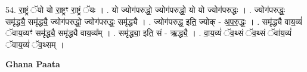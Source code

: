 \documentclass[17pt]{extarticle}
\begin{document}
54. रा॒ष्ट्रं ॅयो यो रा॒ष्ट्रꣳ रा॒ष्ट्रं ॅयः । . यो ज्योग॑परुद्धो॒ ज्योग॑परुद्धो॒ यो यो ज्योग॑परुद्धः । . ज्योग॑परुद्धः॒ समृ॑द्ध्यै॒ समृ॑द्ध्यै॒ ज्योग॑परुद्धो॒ ज्योग॑परुद्धः॒ समृ॑द्ध्यै । . ज्योग॑परुद्ध॒ इति॒ ज्योक् - अ॒प॒रु॒द्धः॒ । . समृ॑द्ध्यै वाय॒व्यं॑ ॅवाय॒व्यꣳ॑ समृ॑द्ध्यै॒ समृ॑द्ध्यै वाय॒व्य᳚म् । . समृ॑द्ध्या॒ इति॒ सं - ऋ॒द्ध्यै॒ । . वा॒य॒व्यं॑ ॅव॒थ्सं ॅव॒थ्सं ॅवा॑य॒व्यं॑ ॅवाय॒व्यं॑ ॅव॒थ्सम् । \newline

\textbf{Ghana Paata } \newline
\end{document}
